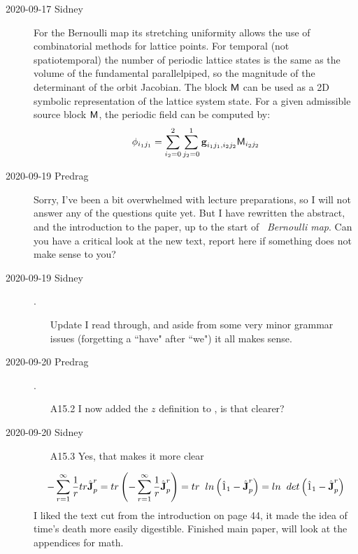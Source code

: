 \begin{description}
\item[2020-09-17 Sidney]
For the Bernoulli map its stretching uniformity allows the use of combinatorial methods for lattice points. For temporal (not spatiotemporal) the number of periodic lattice states is the same as the volume of the fundamental parallelpiped, so the magnitude of the determinant of the orbit Jacobian. The block $\mathsf{M}$ can be used as a 2D symbolic representation of the lattice system state. For a given admissible source block $\mathsf{M}$, the periodic field can be computed by:
\[
\phi_{i_1j_1}=\sum_{i_2=0}^2\sum_{j_2=0}^1\textbf{g}_{i_1j_1,i_2j_2}\mathsf{M}_{i_2j_2}
\]


\item[2020-09-19 Predrag]
Sorry, I've been a bit overwhelmed with lecture preparations, so
I will not answer any of the questions quite yet. But I have rewritten the
abstract, and the introduction to the paper, up to
the start of ~{\em Bernoulli map}.
Can you have a critical look at the new text, report here if
something does not make sense to you?

\item[2020-09-19 Sidney].
\begin{itemize}
	\item[Update]
I read through, and aside from some very minor grammar issues (forgetting
a ``have" after ``we")
it all makes sense.
\end{itemize}

\item[2020-09-20 Predrag].
\begin{itemize}
	\item[A15.2]
I now added the $z$ definition to ,
is that clearer?
\end{itemize}

\item[2020-09-20 Sidney]
\begin{itemize}
	\item[A15.3]
Yes, that makes it more clear
\end{itemize}
$$-\sum^{\infty}_{r=1}\frac{1}{r}tr\hat{\textbf{J}}_p^r=tr\left(-\sum^{\infty}_{r=1}\frac{1}{r}\hat{\textbf{J}}_p^r\right)=tr\hspace{2mm}ln\left(\hat{1}_1-\hat{\textbf{J}}_p^r\right)=ln\hspace{2mm}det\left(\hat{1}_1-\hat{\textbf{J}}_p^r\right)$$
I liked the text cut from the introduction on page 44, it made the idea of time's death more easily digestible. Finished main paper, will look at the appendices for math.


\end{description}
